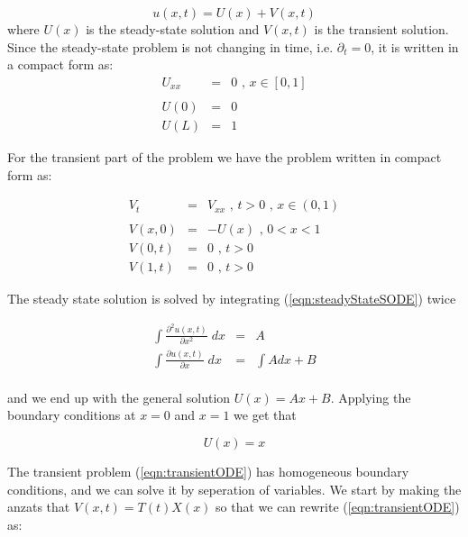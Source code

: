 \documentclass{article}
\begin{document}
\begin{equation}
u(x,t) = U(x) + V(x,t)
\end{equation}
where $U(x)$ is the steady-state solution and $V(x,t)$ is the transient solution.\\ 

Since the steady-state problem is not changing in time, i.e. $\partial_ t = 0$, it is written in a compact form as:
\begin{subequations}
	\begin{eqnarray}
	\label{eqn:steadyStateSODE}
	U_{xx} &=& 0 \textit{ , } x \in [0,1]\\ \nonumber
	\\
	U(0) &=& 0 \textit{  } \\
	U(L) &=& 1
	\end{eqnarray}
\end{subequations}

For the transient part of the problem we have the problem written in compact form as:

\begin{subequations}
	\begin{eqnarray}
	\label{eqn:transientODE}
	V_t &=& V_{xx} \textit{ , } t>0 \textit{ , } x \in (0,1) \\ \nonumber
	\\
	\label{eqn:transientIC}
	V(x,0) &=& -U(x) \textit{ , } 0<x<1 \\
	V(0,t) &=& 0 \textit{ , } t>0 \\
	V(1,t) &=& 0 \textit{ , } t>0
	\end{eqnarray}
\end{subequations}


The steady state solution is solved by integrating (\ref{eqn:steadyStateSODE}) twice

\begin{eqnarray}
\nonumber
\int \frac{\partial^2 u(x,t)}{\partial x^2}\;dx &=& A \\ \nonumber
\int \frac{\partial u(x,t)}{\partial x}\;dx &=& \int Adx +B \\ \nonumber
\end{eqnarray}

and we end up with the general solution $U(x) = Ax + B$. Applying the boundary conditions at $x=0$ and $x=1$ we get that 

\begin{equation}
U(x) = x
\label{eqn:UsteadyState1D}
\end{equation}

The transient problem (\ref{eqn:transientODE}) has homogeneous boundary conditions, and we can solve it by seperation of variables. We start by making the anzats that $V(x,t) = T(t)X(x)$ so that we can rewrite (\ref{eqn:transientODE}) as:
\end{document}
